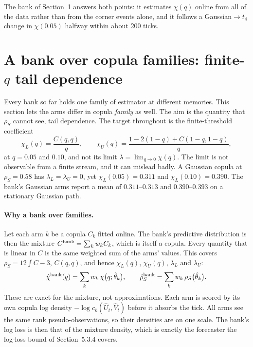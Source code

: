 The bank of Section~\ref{sec:family} answers both points: it estimates $\chi(q)$ online from all of
the data rather than from the corner events alone, and it follows a Gaussian$\to t_4$ change in
$\chi(0.05)$ halfway within about 200 ticks.

\section{A bank over copula families: finite-$q$ tail dependence}
\label{sec:family}

Every bank so far holds one family of estimator at different memories. This section lets the arms
differ in copula \emph{family} as well. The aim is the quantity that $\rho_S$ cannot see, tail
dependence. The target throughout is the finite-threshold coefficient
\[
  \chi_L(q)=\frac{C(q,q)}{q},\qquad \chi_U(q)=\frac{1-2(1-q)+C(1-q,1-q)}{q},
\]
at $q=0.05$ and $0.10$, and not its limit $\lambda=\lim_{q\to0}\chi(q)$. The limit is not observable
from a finite stream, and it can mislead badly. A Gaussian copula at $\rho_S=0.58$ has
$\lambda_L=\lambda_U=0$, yet $\chi_L(0.05)=0.311$ and $\chi_L(0.10)=0.390$. The bank's Gaussian arms
report a mean of $0.311$--$0.313$ and $0.390$--$0.393$ on a stationary Gaussian path.

\paragraph{Why a bank over families.} Let each arm $k$ be a copula $C_k$ fitted online. The bank's
predictive distribution is then the mixture $C^{\rm bank}=\sum_kw_kC_k$, which is itself a copula.
Every quantity that is linear in $C$ is the same weighted sum of the arms' values. This covers
$\rho_S=12\int C-3$, $C(q,q)$, and hence $\chi_L(q)$, $\chi_U(q)$, $\lambda_L$ and $\lambda_U$:
\[
  \hat\chi^{\rm bank}(q)=\sum_k w_k\,\chi\big(q;\hat\theta_k\big),\qquad
  \hat\rho_S^{\rm bank}=\sum_k w_k\,\rho_S\big(\hat\theta_k\big).
\]
These are exact for the mixture, not approximations. Each arm is scored by its own copula log
density $-\log c_k(\hat U_t,\hat V_t)$ before it absorbs the tick. All arms see the same rank
pseudo-observations, so their densities are on one scale. The bank's log loss is then that of the
mixture density, which is exactly the forecaster the log-loss bound of Section~5.3.4 covers.

